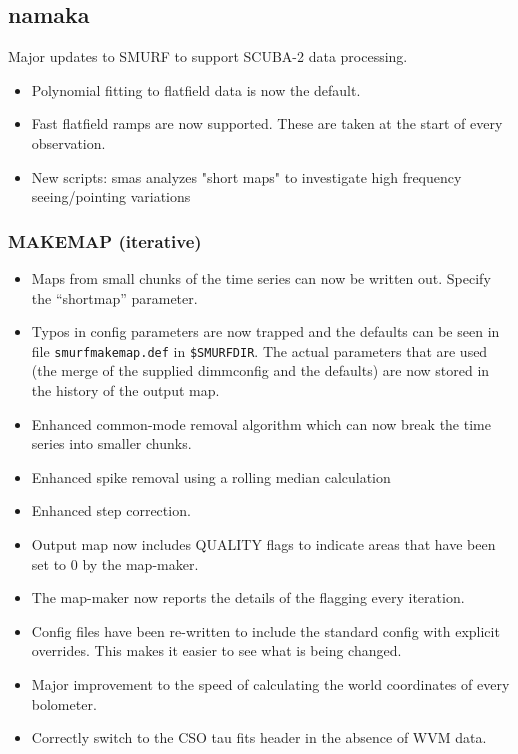 \documentclass[twoside,11pt]{article}
\renewcommand{\_}{\texttt{\symbol{95}}}
\begin{document}
\subsection{namaka}

Major updates to SMURF to support SCUBA-2 data processing.

\begin{itemize}
\item Polynomial fitting to flatfield data is now the default.
\item Fast flatfield ramps are now supported. These are taken at the
  start of every observation.
\item New scripts: smas analyzes "short maps" to investigate high
  frequency seeing/pointing variations
\end{itemize}

\subsubsection{MAKEMAP (iterative)}

\begin{itemize}
\item Maps from small chunks of the time series can now be written
  out. Specify the ``shortmap'' parameter.
\item Typos in config parameters are now trapped and the defaults can
  be seen in file \texttt{smurf\_makemap.def} in
  \texttt{\$SMURF\_DIR}. The actual parameters that are used (the
  merge of the supplied dimmconfig and the defaults) are now stored in
  the history of the output map.
\item Enhanced common-mode removal algorithm which can now break the
  time series into smaller chunks.
\item Enhanced spike removal using a rolling median calculation
\item Enhanced step correction.
\item Output map now includes QUALITY flags to indicate areas that
  have been set to 0 by the map-maker.
\item The map-maker now reports the details of the flagging every iteration.
\item Config files have been re-written to include the standard config
  with explicit overrides. This makes it easier to see what is being
  changed.
\item Major improvement to the speed of calculating the world
  coordinates of every bolometer.
\item Correctly switch to the CSO tau fits header in the absence of WVM data.
\end{itemize}
\end{document}
